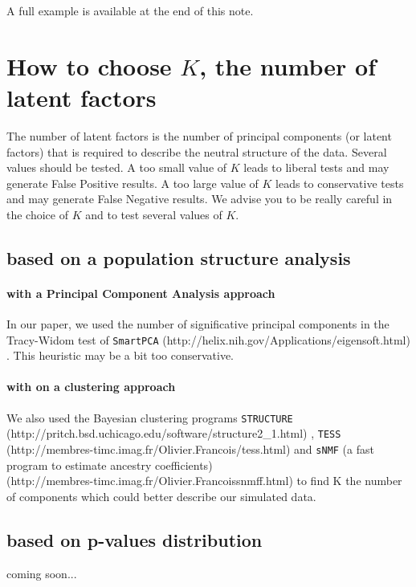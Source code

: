 \documentclass[10pt,a4paper]{article}
\begin{document}
\noindent
A full example is available at the end of this note.

\section{How to choose $K$, the number of latent factors}
The number of latent factors is the number of principal components (or latent factors) that is
required to describe the neutral structure of the data. Several values should be tested.
A too small value of $K$ leads to liberal tests and may generate False Positive results.
A too large value of $K$ leads to conservative tests and may generate False Negative results.           
We advise you to be really careful in the choice of $K$ and to test several values of $K$.

\subsection{based on a population structure analysis}
\paragraph{with a Principal Component Analysis approach}
In our paper, we used the number of significative principal components in the
Tracy-Widom test of {\tt SmartPCA} (http://helix.nih.gov/Applications/eigensoft.html)
\cite{Patterson_2006}. This heuristic may be a bit too conservative.

\paragraph{with on a clustering approach}
We also used the Bayesian clustering programs {\tt STRUCTURE}\\
(http://pritch.bsd.uchicago.edu/software/structure2\_1.html) \cite{Pritchard_2000}, {\tt TESS}\\
(http://membres-timc.imag.fr/Olivier.Francois/tess.html) \cite{Chen_2007, Durand_2009} and
{\tt sNMF} (a fast program to estimate ancestry coefficients) \\
(http://membres-timc.imag.fr/Olivier.Francoissnmff.html)
to find K the number of components which could better describe our simulated data.

\subsection{based on p-values distribution}
coming soon...
\end{document}
